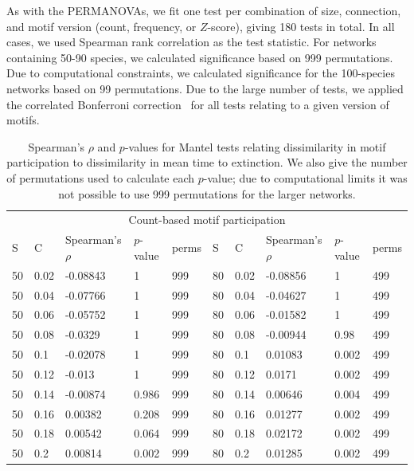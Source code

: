 \documentclass[12pt]{article}
\begin{document}
\begin{spacing}{2.0}
		As with the PERMANOVAs, we fit one test per combination of size, connection, and motif version (count, frequency, or $Z$-score), giving 180 tests in total.
		In all cases, we used Spearman rank correlation as the test statistic.
		For networks containing 50-90 species, we calculated significance based on 999 permutations.
		Due to computational constraints, we calculated significance for the 100-species networks based on 99 permutations.
		Due to the large number of tests, we applied the correlated Bonferroni correction~\citep{Drezner2016} for all tests relating to a given version of motifs.

		\begin{table}[hb!]
			\caption{Spearman's $\rho$ and $p$-values for Mantel tests relating dissimilarity in motif participation to dissimilarity in mean time to extinction. We also give the number of permutations used to calculate each $p$-value; due to computational limits it was not possible to use 999 permutations for the larger networks.}
			\footnotesize
			\label{Manteltab}
			\begin{tabular}{l l | l l | l || ll | ll | l}
			\multicolumn{10}{c}{Count-based motif participation} \\
			S & C & Spearman's $\rho$ & $p$-value & perms & S & C & Spearman's $\rho$ & $p$-value & perms\\
			\hline
            50	&	0.02	&	-0.08843	&	1	&	999	&	80	&	0.02	&	-0.08856	&	1	&	499	\\
            50	&	0.04	&	-0.07766	&	1	&	999	&	80	&	0.04	&	-0.04627	&	1	&	499	\\
            50	&	0.06	&	-0.05752	&	1	&	999	&	80	&	0.06	&	-0.01582	&	1	&	499	\\
            50	&	0.08	&	-0.0329	&	1	&	999	&	80	&	0.08	&	-0.00944	&	0.98	&	499	\\
            50	&	0.1	&	-0.02078	&	1	&	999	&	80	&	0.1	&	0.01083	&	0.002	&	499	\\
            50	&	0.12	&	-0.013	&	1	&	999	&	80	&	0.12	&	0.0171	&	0.002	&	499	\\
            50	&	0.14	&	-0.00874	&	0.986	&	999	&	80	&	0.14	&	0.00646	&	0.004	&	499	\\
            50	&	0.16	&	0.00382	&	0.208	&	999	&	80	&	0.16	&	0.01277	&	0.002	&	499	\\
            50	&	0.18	&	0.00542	&	0.064	&	999	&	80	&	0.18	&	0.02172	&	0.002	&	499	\\
            50	&	0.2	&	0.00814	&	0.002	&	999	&	80	&	0.2	&	0.01285	&	0.002	&	499	\\

\end{tabular}
\end{table}
\end{spacing}
\end{document}
